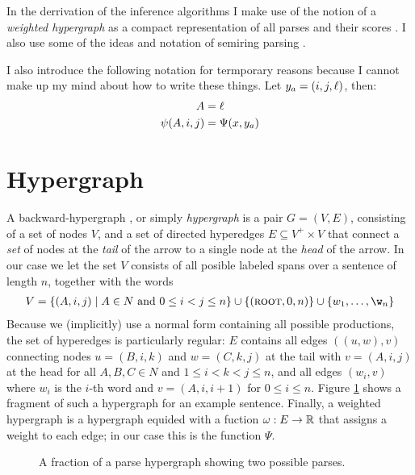 In the derrivation of the inference algorithms I make use of the notion of a \textit{weighted hypergraph} as a compact representation of all parses and their scores \citep{gallo1993directed,klein2004parsing}. I also use some of the ideas and notation of semiring parsing \citep{goodman1999semiring,eisner2009semirings}.

I also introduce the following notation for termporary reasons because I cannot make up my mind about how to write these things. Let $\y_a = (i, j, \ell)$, then:
\begin{align*}
  A &= \ell  \\
  \psi(A, i, j) &= \Psi(\x, \y_a)
\end{align*}

\section{Hypergraph}
  A backward-hypergraph \citep{gallo1993directed}, or simply \textit{hypergraph} is a pair $G = (V, E)$, consisting of a set of nodes $V$, and a set of directed hyperedges $E \subseteq V^{+} \times V$ that connect a \textit{set} of nodes at the \textit{tail} of the arrow to a single node at the \textit{head} of the arrow. In our case we let the set $V$ consists of all posible labeled spans over a sentence of length $n$, together with the words
  \begin{align*}
    V = \{ (A, i, j) \mid A \in N \text{ and } 0 \leq i < j \leq n \} \cup \{ (\textsc{root}, 0, n) \} \cup \{ w_1, \dots, \w_n \}
  \end{align*}
  Because we (implicitly) use a normal form containing all possible productions, the set of hyperedges is particularly regular: $E$ contains all edges $((u, w), v)$ connecting nodes $u = (B, i, k)$ and $w = (C, k, j)$ at the tail with $v = (A, i, j)$ at the head for all $A, B, C \in N$ and $1 \leq i < k < j \leq n$, and all edges $(w_i, v)$ where $w_i$ is the $i$-th word and $v = (A, i, i+1)$ for $0 \leq i \leq n$. Figure \ref{fig:hypergraph} shows a fragment of such a hypergraph for an example sentence. Finally, a weighted hypergraph is a hypergraph equided with a fuction $\omega : E \to \reals$ that assigns a weight to each edge; in our case this is the function $\Psi$.

\begin{figure}[h]
  \center
  \begin{tikzpicture}[scale=.6]
    
  \end{tikzpicture}
  \caption{A fraction of a parse hypergraph showing two possible parses.}
  \label{fig:hypergraph}
\end{figure}


